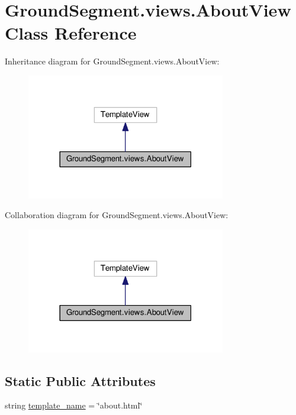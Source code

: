 \hypertarget{class_ground_segment_1_1views_1_1_about_view}{}\section{Ground\+Segment.\+views.\+About\+View Class Reference}
\label{class_ground_segment_1_1views_1_1_about_view}


Inheritance diagram for Ground\+Segment.\+views.\+About\+View\+:\nopagebreak
\begin{figure}[H]
\begin{center}
\leavevmode
\includegraphics[width=246pt]{class_ground_segment_1_1views_1_1_about_view__inherit__graph}
\end{center}
\end{figure}


Collaboration diagram for Ground\+Segment.\+views.\+About\+View\+:\nopagebreak
\begin{figure}[H]
\begin{center}
\leavevmode
\includegraphics[width=246pt]{class_ground_segment_1_1views_1_1_about_view__coll__graph}
\end{center}
\end{figure}
\subsection*{Static Public Attributes}
\begin{DoxyCompactItemize}
\item 
string \hyperlink{class_ground_segment_1_1views_1_1_about_view_afcb2c31fc5a893eaaae12cbf7620b96d}{template\+\_\+name} = \char`\"{}about.\+html\char`\"{}
\end{DoxyCompactItemize}


